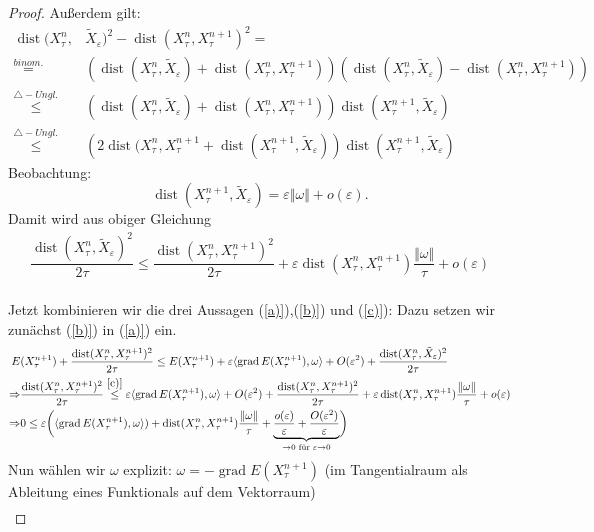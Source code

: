 \documentclass[11pt,a4paper,notitlepage]{scrreprt}
\newcommand{\dist}{\operatorname{dist}}
\newcommand{\grad}{\operatorname{grad}}
\begin{document}
\begin{proof}
Außerdem gilt:
\begin{align*}
\dist (X_\tau^n,&\tilde{X}_\varepsilon)^2-\dist(X_\tau^n,X_\tau^{n+1})^2=\\
\overset{binom.}=&\left(\dist(X_\tau^n,\tilde{X}_\varepsilon)+\dist(X_\tau^n,X_\tau^{n+1})\right)\left(\dist(X_\tau^n,\tilde{X}_\varepsilon)-\dist(X_\tau^n,X_\tau^{n+1})\right)\\
\overset{\triangle-Ungl.}\leq& \left(\dist(X_\tau^n,\tilde{X}_\varepsilon)+\dist(X_\tau^n,X_\tau^{n+1})\right)\dist(X_\tau^{n+1},\tilde{X}_\varepsilon) \\
\overset{\triangle-Ungl.}\leq&\left(2\dist(X_\tau^n,X_\tau^{n+1}+\dist(X_\tau^{n+1},\tilde{X}_\varepsilon)\right)\dist(X_\tau^{n+1},\tilde{X}_\varepsilon)
\end{align*}
Beobachtung: \[\dist(X_\tau^{n+1},\tilde{X}_\varepsilon)=\varepsilon\Vert \omega \Vert + o(\varepsilon). \]
Damit wird aus obiger Gleichung
\begin{eqnarray}
\dfrac{\dist(X_\tau^n,\tilde{X}_\varepsilon)^2}{2\tau}\leq \dfrac{\dist(X_\tau^n,X_\tau^{n+1})^2}{2\tau}+\varepsilon\dist(X_\tau^n,X_\tau^{n+1})\dfrac{\Vert \omega \Vert}{\tau} + o(\varepsilon) \label{c)}
\end{eqnarray}
\\
Jetzt kombinieren wir die drei Aussagen (\ref{a)}),(\ref{b)}) und (\ref{c)}): Dazu setzen wir zunächst (\ref{b)}) in (\ref{a)}) ein.
\begin{align*}
E&(X_\tau^{n+1})+\dfrac{\dist(X_\tau^n,X_\tau^{n+1})^2}{2\tau}\leq E(X_\tau^{n+1})+\varepsilon\langle \grad E(X_\tau^{n+1}),\omega\rangle+O(\varepsilon^2)+\dfrac{\dist(X_\tau^n,\tilde{X}_\varepsilon)^2}{2\tau}
\\
\Rightarrow& \dfrac{\dist(X_\tau^n,X_\tau^{n+1})^2}{2\tau}\overset{\ref{c)}}{\leq} \varepsilon\langle \grad E(X_\tau^{n+1}),\omega\rangle+O(\varepsilon^2)+ \dfrac{\dist(X_\tau^n,X_\tau^{n+1})^2}{2\tau}+\varepsilon\dist(X_\tau^n,X_\tau^{n+1})\dfrac{\Vert \omega \Vert}{\tau} + o(\varepsilon)\\
\Rightarrow& 0\leq \varepsilon \bigg(\langle \grad E(X_\tau^{n+1}),\omega\rangle)+\dist(X_\tau^n,X_\tau^{n+1})\dfrac{\Vert \omega \Vert}{\tau} +\underset{\to 0 \text{ für } \varepsilon \to 0} {\underbrace{\dfrac{o(\varepsilon)}{\varepsilon}+\dfrac{O(\varepsilon^2)}{\varepsilon}}} \bigg)
\end{align*}
Nun wählen wir $\omega$ explizit: $\omega=-\grad E(X_\tau^{n+1})$ (im Tangentialraum als Ableitung eines Funktionals auf dem Vektorraum)
\begin{align*}

\end{align*}
\end{proof}
\end{document}
